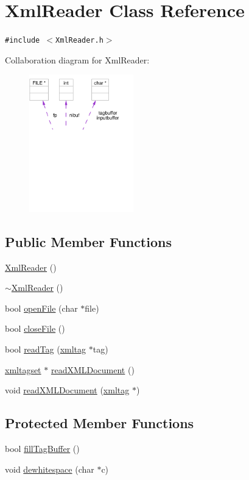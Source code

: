 \hypertarget{classXmlReader}{
\section{Xml\-Reader Class Reference}
\label{classXmlReader}
}
{\tt \#include $<$Xml\-Reader.h$>$}

Collaboration diagram for Xml\-Reader:\begin{figure}[H]
\begin{center}
\leavevmode
\includegraphics[width=128pt]{classXmlReader__coll__graph}
\end{center}
\end{figure}
\subsection*{Public Member Functions}
\begin{CompactItemize}
\item 
\hyperlink{classXmlReader_a0}{Xml\-Reader} ()
\item 
\hyperlink{classXmlReader_a1}{$\sim$Xml\-Reader} ()
\item 
bool \hyperlink{classXmlReader_a2}{open\-File} (char $\ast$file)
\item 
bool \hyperlink{classXmlReader_a3}{close\-File} ()
\item 
bool \hyperlink{classXmlReader_a4}{read\-Tag} (\hyperlink{classXmlReader_1_1xmltag}{xmltag} $\ast$tag)
\item 
\hyperlink{classXmlReader_1_1xmltagset}{xmltagset} $\ast$ \hyperlink{classXmlReader_a5}{read\-XMLDocument} ()
\item 
void \hyperlink{classXmlReader_a6}{read\-XMLDocument} (\hyperlink{classXmlReader_1_1xmltag}{xmltag} $\ast$)
\end{CompactItemize}
\subsection*{Protected Member Functions}
\begin{CompactItemize}
\item 
bool \hyperlink{classXmlReader_b0}{fill\-Tag\-Buffer} ()
\item 
void \hyperlink{classXmlReader_b1}{dewhitespace} (char $\ast$c)
\end{CompactItemize}
